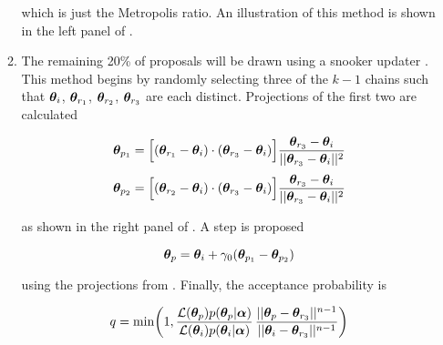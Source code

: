 \begin{enumerate}
\begin{enumerate}
\noindent which is just the Metropolis ratio.  An illustration of this method is shown in the left panel of
.

\item \label{itm:update_demc_snooker} The remaining 20\% of proposals will be drawn using a snooker updater
.  This method begins by randomly selecting three of the
$k - 1$ chains such that $\boldsymbol{\theta}_i$, $\boldsymbol{\theta}_{r_1}$,
$\boldsymbol{\theta}_{r_2}$, $\boldsymbol{\theta}_{r_3}$ are each distinct.  Projections of the first two are calculated

\vspace{-35pt}

\begin{subequations}
\begin{align}
\boldsymbol{\theta}_{p_1} = \Big[ (\boldsymbol{\theta}_{r_1} - \boldsymbol{\theta}_i) \cdot
(\boldsymbol{\theta}_{r_3} - \boldsymbol{\theta}_i) \Big]
\frac{\boldsymbol{\theta}_{r_3} - \boldsymbol{\theta}_i}{||\boldsymbol{\theta}_{r_3} - \boldsymbol{\theta}_i||^2}
\label{eq:elifetime_fit_mcmc_de_snooker_proj1}
\\[3pt]
\boldsymbol{\theta}_{p_2} = \Big[ (\boldsymbol{\theta}_{r_2} - \boldsymbol{\theta}_i) \cdot
(\boldsymbol{\theta}_{r_3} - \boldsymbol{\theta}_i) \Big]
\frac{\boldsymbol{\theta}_{r_3} - \boldsymbol{\theta}_i}{||\boldsymbol{\theta}_{r_3} - \boldsymbol{\theta}_i||^2}
\label{eq:elifetime_fit_mcmc_de_snooker_proj2}
\end{align}
\label{eq:elifetime_fit_mcmc_de_snooker_projs}
\end{subequations}

\vspace{-25pt}

\noindent as shown in the right panel of .  A step is proposed

\vspace{-10pt}

\begin{equation}
\boldsymbol{\theta}_p = \boldsymbol{\theta}_i + \gamma_0 (\boldsymbol{\theta}_{p_1} - \boldsymbol{\theta}_{p_2})
\label{eq:elifetime_fit_mcmc_update_snooker}
\end{equation}

\noindent using the projections from .  Finally, the acceptance probability is

\vspace{-15pt}

\begin{equation}
q = \mathrm{min} \bigg( 1, \frac{\mathcal{L}(\boldsymbol{\theta}_p) p(\boldsymbol{\theta}_p|\boldsymbol{\alpha})}
{\mathcal{L}(\boldsymbol{\theta}_i) p(\boldsymbol{\theta}_i|\boldsymbol{\alpha})}
\, \frac{||\boldsymbol{\theta}_p - \boldsymbol{\theta}_{r_3}||^{n - 1}} {||\boldsymbol{\theta}_i - \boldsymbol{\theta}_{r_3}||^{n - 1}} \bigg)
\label{eq:elifetime_fit_mcmc_demc_snook_acc_prob}
\end{equation}


\end{enumerate}
\end{enumerate}
